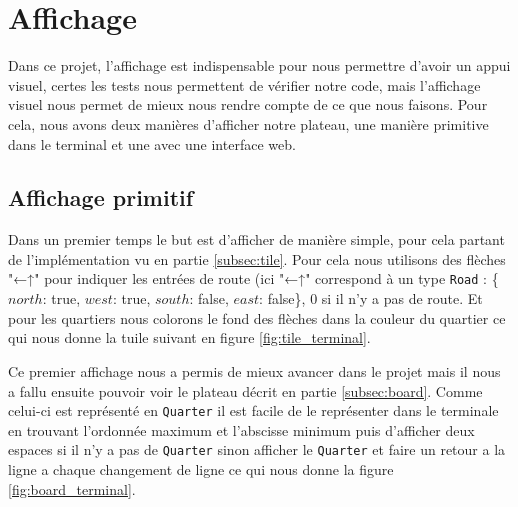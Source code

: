 \section{Affichage}

Dans ce projet, l'affichage est indispensable pour nous permettre d'avoir un appui visuel, certes les tests nous permettent de vérifier notre code, mais l'affichage visuel nous permet de mieux nous rendre compte de ce que nous faisons. Pour cela, nous avons deux manières d'afficher notre plateau, une manière primitive dans le terminal et une avec une interface web.

\subsection{Affichage primitif}

Dans un premier temps le but est d'afficher de manière simple, pour cela partant de l'implémentation vu en partie \ref{subsec:tile}. Pour cela nous utilisons des flèches "←↑" pour indiquer les entrées de route (ici "←↑" correspond à un type \texttt{Road} : \{$north$: true, $west$: true, $south$: false, $east$: false\}, 0 si il n'y a pas de route. Et pour les quartiers nous colorons le fond des flèches dans la couleur du quartier ce qui nous donne la tuile suivant en figure \ref{fig:tile_terminal}.


Ce premier affichage nous a permis de mieux avancer dans le projet mais il nous a fallu ensuite pouvoir voir le plateau décrit en partie \ref{subsec:board}. Comme celui-ci est représenté en \texttt{Quarter} il est facile de le représenter dans le terminale en trouvant l'ordonnée maximum et l'abscisse minimum puis d'afficher deux espaces si il n'y a pas de \texttt{Quarter} sinon afficher le \texttt{Quarter} et faire un retour a la ligne a chaque changement de ligne ce qui nous donne la figure \ref{fig:board_terminal}.


